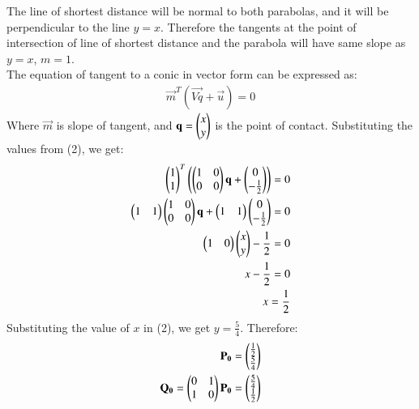 \documentclass[12pt]{article}
\begin{document}
The line of shortest distance will be normal to both parabolas, and it will be perpendicular to the line $y=x$. Therefore the tangents at the point of intersection of line of shortest distance and the parabola will have same slope as $y=x$, $m=1$.\vspace{1cm}\\
The equation of tangent to a conic in vector form can be expressed as:
\begin{align}
    \vec{m}^T(\vec{Vq} + \vec{u}) =0
\end{align}
Where $\vec{m}$ is slope of tangent, and $\mathbf{q} = \begin{pmatrix}x\\y\end{pmatrix}$ is the point of contact.
Substituting the values from (2), we get:
\begin{align}
    \begin{pmatrix}1\\1\end{pmatrix}^T\left(\begin{pmatrix}1&0\\0&0\end{pmatrix}\mathbf{q} + \begin{pmatrix}0\\-\frac{1}{2}\end{pmatrix}\right) = 0\\
    \begin{pmatrix}1&1\end{pmatrix}\begin{pmatrix}1&0\\0&0\end{pmatrix}\mathbf{q} + \begin{pmatrix}1 & 1\end{pmatrix}\begin{pmatrix}0\\-\frac{1}{2}\end{pmatrix} = 0\\
    \begin{pmatrix}1&0\end{pmatrix}\begin{pmatrix}x\\y\end{pmatrix} -\frac{1}{2} = 0\\
    x - \frac{1}{2} = 0\\
    x = \frac{1}{2}
\end{align}
Substituting the value of $x$ in (2), we get $y = \frac{5}{4}$. Therefore:
\begin{align}
\mathbf{P_0} = \begin{pmatrix}\frac{1}{2} \\ \frac{5}{4}\end{pmatrix}\\
\mathbf{Q_0} = \begin{pmatrix}0&1\\1&0\end{pmatrix}\mathbf{P_0} = \begin{pmatrix}\frac{5}{4} \\ \frac{1}{2}\end{pmatrix}
\end{align}
\end{document}

